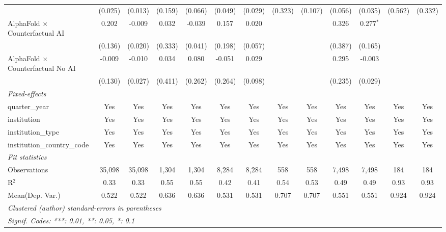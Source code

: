 \begin{tabular}{lcccccccccccc}
                                            & (0.025)       & (0.013)       & (0.159) & (0.066) & (0.049)       & (0.029)       & (0.323) & (0.107) & (0.056) & (0.035)     & (0.562) & (0.332)\\   
   AlphaFold $\times$ Counterfactual AI     & 0.202         & -0.009        & 0.032   & -0.039  & 0.157         & 0.020         &         &         & 0.326   & 0.277$^{*}$ &         &   \\   
                                            & (0.136)       & (0.020)       & (0.333) & (0.041) & (0.198)       & (0.057)       &         &         & (0.387) & (0.165)     &         &   \\   
   AlphaFold $\times$ Counterfactual No AI  & -0.009        & -0.010        & 0.034   & 0.080   & -0.051        & 0.029         &         &         & 0.295   & -0.003      &         &   \\   
                                            & (0.130)       & (0.027)       & (0.411) & (0.262) & (0.264)       & (0.098)       &         &         & (0.235) & (0.029)     &         &   \\   
   \midrule
   \emph{Fixed-effects}\\
   quarter\_year                            & Yes           & Yes           & Yes     & Yes     & Yes           & Yes           & Yes     & Yes     & Yes     & Yes         & Yes     & Yes\\  
   institution                              & Yes           & Yes           & Yes     & Yes     & Yes           & Yes           & Yes     & Yes     & Yes     & Yes         & Yes     & Yes\\  
   institution\_type                        & Yes           & Yes           & Yes     & Yes     & Yes           & Yes           & Yes     & Yes     & Yes     & Yes         & Yes     & Yes\\  
   institution\_country\_code               & Yes           & Yes           & Yes     & Yes     & Yes           & Yes           & Yes     & Yes     & Yes     & Yes         & Yes     & Yes\\  
   \midrule
   \emph{Fit statistics}\\
   Observations                             & 35,098        & 35,098        & 1,304   & 1,304   & 8,284         & 8,284         & 558     & 558     & 7,498   & 7,498       & 184     & 184\\  
   R$^2$                                    & 0.33          & 0.33          & 0.55    & 0.55    & 0.42          & 0.41          & 0.54    & 0.53    & 0.49    & 0.49        & 0.93    & 0.93\\  
Mean(Dep. Var.) & 0.522 & 0.522 & 0.636 & 0.636 & 0.531 & 0.531 & 0.707 & 0.707 & 0.551 & 0.551 & 0.924 & 0.924 \\
   \midrule \midrule
   \multicolumn{13}{l}{\emph{Clustered (author) standard-errors in parentheses}}\\
   \multicolumn{13}{l}{\emph{Signif. Codes: ***: 0.01, **: 0.05, *: 0.1}}\\
\end{tabular}
\par\endgroup
